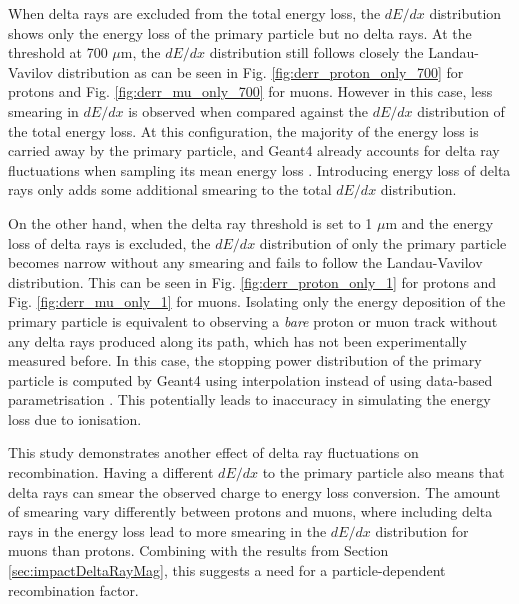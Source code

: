 When delta rays are excluded from the total energy loss, the $dE/dx$ distribution shows only the energy loss of the primary particle but no delta rays. 
At the threshold at 700 $\mu$m, the $dE/dx$ distribution still follows closely the Landau-Vavilov distribution as can be seen in Fig. \ref{fig:derr_proton_only_700} for protons and  Fig. \ref{fig:derr_mu_only_700} for muons.
However in this case, less smearing in $dE/dx$ is observed when compared against the $dE/dx$ distribution of the total energy loss.
At this configuration, the majority of the energy loss is carried away by the primary particle, and Geant4 already accounts for delta ray fluctuations when sampling its mean energy loss \cite{geant4}.
Introducing energy loss of delta rays only adds some additional smearing to the total $dE/dx$ distribution.

On the other hand, when the delta ray threshold is set to 1 $\mu$m and the energy loss of delta rays is excluded, the $dE/dx$ distribution of only the primary particle becomes narrow without any smearing and fails to follow the Landau-Vavilov distribution.
This can be seen in Fig. \ref{fig:derr_proton_only_1} for protons and Fig. \ref{fig:derr_mu_only_1} for muons. 
Isolating only the energy deposition of the primary particle is equivalent to observing a \textit{bare} proton or muon track without any delta rays produced along its path, which has not been experimentally measured before.
In this case, the stopping power distribution of the primary particle is computed by Geant4 using interpolation instead of using data-based parametrisation \cite{geant4}.
This potentially leads to inaccuracy in simulating the energy loss due to ionisation.

This study demonstrates another effect of delta ray fluctuations on recombination.
Having a different $dE/dx$ to the primary particle also means that delta rays can smear the observed charge to energy loss conversion.
The amount of smearing vary differently between protons and muons, where including delta rays in the energy loss lead to more smearing in the $dE/dx$ distribution for muons than protons. 
Combining with the results from Section \ref{sec:impactDeltaRayMag}, this suggests a need for a particle-dependent recombination factor.   

